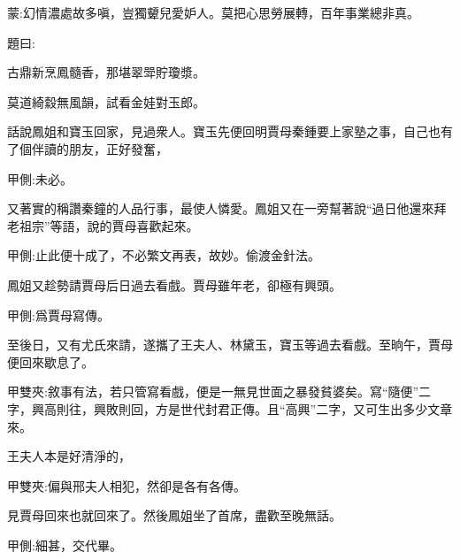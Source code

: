 
\begin{parag}
    \begin{note}蒙:幻情濃處故多嗔，豈獨顰兒愛妒人。莫把心思勞展轉，百年事業總非真。\end{note}
\end{parag}


\begin{parag}
    題曰:
\end{parag}


\begin{poem}
    \begin{pl}古鼎新烹鳳髓香，那堪翠斝貯瓊漿。\end{pl}

    \begin{pl}莫道綺縠無風韻，試看金娃對玉郎。\end{pl}
\end{poem}


\begin{parag}
    話說鳳姐和寶玉回家，見過衆人。寶玉先便回明賈母秦鍾要上家塾之事，自己也有了個伴讀的朋友，正好發奮，\begin{note}甲側:未必。\end{note}又著實的稱讚秦鐘的人品行事，最使人憐愛。鳳姐又在一旁幫著說“過日他還來拜老祖宗”等語，說的賈母喜歡起來。\begin{note}甲側:止此便十成了，不必繁文再表，故妙。偷渡金針法。\end{note}鳳姐又趁勢請賈母后日過去看戲。賈母雖年老，卻極有興頭。\begin{note}甲側:爲賈母寫傳。\end{note}至後日，又有尤氏來請，遂攜了王夫人、林黛玉，寶玉等過去看戲。至晌午，賈母便回來歇息了。\begin{note}甲雙夾:敘事有法，若只管寫看戲，便是一無見世面之暴發貧婆矣。寫“隨便”二字，興高則往，興敗則回，方是世代封君正傳。且“高興”二字，又可生出多少文章來。\end{note}王夫人本是好清淨的，\begin{note}甲雙夾:偏與邢夫人相犯，然卻是各有各傳。\end{note}見賈母回來也就回來了。然後鳳姐坐了首席，盡歡至晚無話。\begin{note}甲側:細甚，交代畢。\end{note}
\end{parag}


